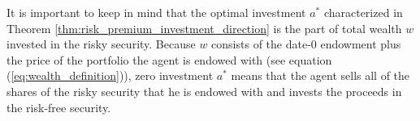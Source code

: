 \documentclass[\topdir/lecture\_notes.tex]{subfiles}
\begin{document}
It is important to keep in mind that the optimal investment $a^{*}$ characterized in Theorem \ref{thm:risk_premium_investment_direction} is the part of total wealth $w$ invested in the risky security. Because $w$ consists of the date-$0$ endowment plus the price of the portfolio the agent is endowed with (see equation (\ref{eq:wealth_definition})), zero investment $a^{*}$ means that the agent sells all of the shares of the risky security that he is endowed with and invests the proceeds in the risk-free security.


\end{document}
